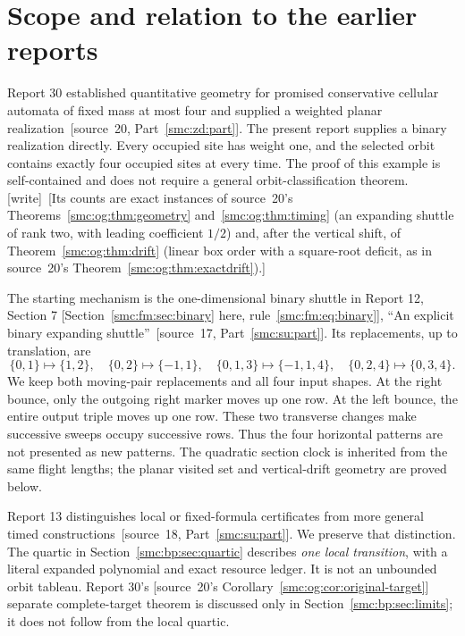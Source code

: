 \documentclass[11pt,letterpaper]{article}
\numberwithin{equation}{section}
\theoremstyle{definition}
\theoremstyle{remark}
\newcommand{\wtag}{\textup{[write]}}
\begin{document}
\section{Scope and relation to the earlier reports}\label{smc:bp:sec:scope}
Report 30 established quantitative geometry for promised conservative cellular automata of fixed mass at most four and supplied a weighted planar realization~\textup{[source~20, Part~\ref{smc:zd:part}]}. The present report supplies a binary realization directly. Every occupied site has weight one, and the selected orbit contains exactly four occupied sites at every time. The proof of this example is self-contained and does not require a general orbit-classification theorem.
\wtag\ [Its counts are exact instances of source~20's Theorems~\ref{smc:og:thm:geometry} and~\ref{smc:og:thm:timing} (an expanding shuttle of rank two, with leading coefficient $1/2$) and, after the vertical shift, of Theorem~\ref{smc:og:thm:drift} (linear box order with a square-root deficit, as in source~20's Theorem~\ref{smc:og:thm:exactdrift}).]

The starting mechanism is the one-dimensional binary shuttle in Report 12, Section 7 \textup{[Section~\ref{smc:fm:sec:binary} here, rule~\eqref{smc:fm:eq:binary}]}, ``An explicit binary expanding shuttle''~\textup{[source~17, Part~\ref{smc:su:part}]}. Its replacements, up to translation, are
\[
\{0,1\}\mapsto\{1,2\},\quad
\{0,2\}\mapsto\{-1,1\},\quad
\{0,1,3\}\mapsto\{-1,1,4\},\quad
\{0,2,4\}\mapsto\{0,3,4\}.
\]
We keep both moving-pair replacements and all four input shapes. At the right bounce, only the outgoing right marker moves up one row. At the left bounce, the entire output triple moves up one row. These two transverse changes make successive sweeps occupy successive rows. Thus the four horizontal patterns are not presented as new patterns. The quadratic section clock is inherited from the same flight lengths; the planar visited set and vertical-drift geometry are proved below.

Report 13 distinguishes local or fixed-formula certificates from more general timed constructions~\textup{[source~18, Part~\ref{smc:su:part}]}. We preserve that distinction. The quartic in Section~\ref{smc:bp:sec:quartic} describes \emph{one local transition}, with a literal expanded polynomial and exact resource ledger. It is not an unbounded orbit tableau. Report 30's \textup{[source~20's Corollary~\ref{smc:og:cor:original-target}]} separate complete-target theorem is discussed only in Section~\ref{smc:bp:sec:limits}; it does not follow from the local quartic.
\end{document}
